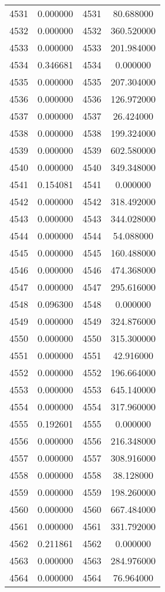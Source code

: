 \documentclass[12pt]{article}
\begin{document}
\begin{longtable}{@{}cccc@{}}
4531 & 0.000000 & 4531 & 80.688000 \\
4532 & 0.000000 & 4532 & 360.520000 \\
4533 & 0.000000 & 4533 & 201.984000 \\
4534 & 0.346681 & 4534 & 0.000000 \\
4535 & 0.000000 & 4535 & 207.304000 \\
4536 & 0.000000 & 4536 & 126.972000 \\
4537 & 0.000000 & 4537 & 26.424000 \\
4538 & 0.000000 & 4538 & 199.324000 \\
4539 & 0.000000 & 4539 & 602.580000 \\
4540 & 0.000000 & 4540 & 349.348000 \\
4541 & 0.154081 & 4541 & 0.000000 \\
4542 & 0.000000 & 4542 & 318.492000 \\
4543 & 0.000000 & 4543 & 344.028000 \\
4544 & 0.000000 & 4544 & 54.088000 \\
4545 & 0.000000 & 4545 & 160.488000 \\
4546 & 0.000000 & 4546 & 474.368000 \\
4547 & 0.000000 & 4547 & 295.616000 \\
4548 & 0.096300 & 4548 & 0.000000 \\
4549 & 0.000000 & 4549 & 324.876000 \\
4550 & 0.000000 & 4550 & 315.300000 \\
4551 & 0.000000 & 4551 & 42.916000 \\
4552 & 0.000000 & 4552 & 196.664000 \\
4553 & 0.000000 & 4553 & 645.140000 \\
4554 & 0.000000 & 4554 & 317.960000 \\
4555 & 0.192601 & 4555 & 0.000000 \\
4556 & 0.000000 & 4556 & 216.348000 \\
4557 & 0.000000 & 4557 & 308.916000 \\
4558 & 0.000000 & 4558 & 38.128000 \\
4559 & 0.000000 & 4559 & 198.260000 \\
4560 & 0.000000 & 4560 & 667.484000 \\
4561 & 0.000000 & 4561 & 331.792000 \\
4562 & 0.211861 & 4562 & 0.000000 \\
4563 & 0.000000 & 4563 & 284.976000 \\
4564 & 0.000000 & 4564 & 76.964000 \\

\end{longtable}
\end{document}
